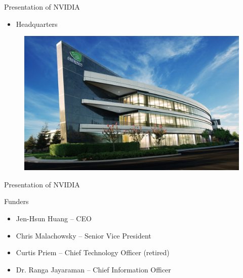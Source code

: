 \documentclass{beamer}
\begin{document}
\begin{frame}{Presentation of NVIDIA}
	\transdissolve[duration=0.08]
	\begin{itemize}
		\item<+->{Headquarters}
	\end{itemize}
	\begin{figure}[h]
		\includegraphics[width=1.00\textheight]{images/NVIDIA_HEADQUARTERS.jpg}
	\end{figure}
\end{frame}


\begin{frame}{Presentation of NVIDIA}
	\begin{block}{Funders}
		\begin{itemize}
			\item<+->{Jen-Hsun Huang -- CEO}
			\item<+->{Chris Malachowsky -- Senior Vice President}
			\item<+->{Curtis Priem -- Chief Technology Officer (retired)}
			\item<+->{Dr. Ranga Jayaraman -- Chief Information Officer}
		\end{itemize}
	\end{block}

\end{frame}
\end{document}

